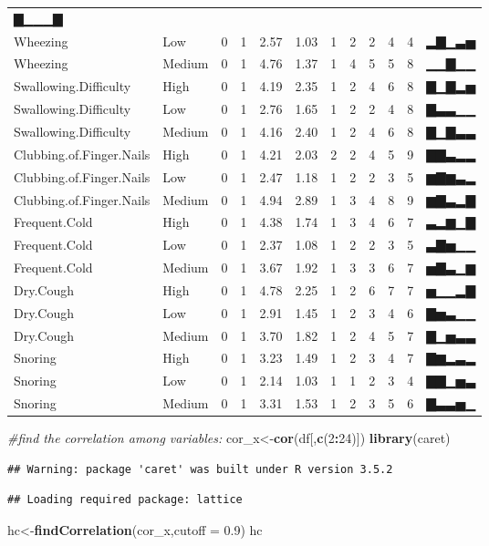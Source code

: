 \documentclass[]{article}
\newenvironment{Shaded}{\begin{snugshade}}{\end{snugshade}}
\newcommand{\KeywordTok}[1]{\textcolor[rgb]{0.13,0.29,0.53}{\textbf{#1}}}
\newcommand{\DataTypeTok}[1]{\textcolor[rgb]{0.13,0.29,0.53}{#1}}
\newcommand{\DecValTok}[1]{\textcolor[rgb]{0.00,0.00,0.81}{#1}}
\newcommand{\FloatTok}[1]{\textcolor[rgb]{0.00,0.00,0.81}{#1}}
\newcommand{\CommentTok}[1]{\textcolor[rgb]{0.56,0.35,0.01}{\textit{#1}}}
\newcommand{\OperatorTok}[1]{\textcolor[rgb]{0.81,0.36,0.00}{\textbf{#1}}}
\newcommand{\NormalTok}[1]{#1}
\begin{document}
\begin{longtable}[]{@{}llrrrrrrrrrl@{}}
▇▁▁▁▇\tabularnewline
Wheezing & Low & 0 & 1 & 2.57 & 1.03 & 1 & 2 & 2 & 4 & 4 &
▂▇▁▃▅\tabularnewline
Wheezing & Medium & 0 & 1 & 4.76 & 1.37 & 1 & 4 & 5 & 5 & 8 &
▁▁▇▁▁\tabularnewline
Swallowing.Difficulty & High & 0 & 1 & 4.19 & 2.35 & 1 & 2 & 4 & 6 & 8 &
▇▁▇▂▅\tabularnewline
Swallowing.Difficulty & Low & 0 & 1 & 2.76 & 1.65 & 1 & 2 & 2 & 4 & 8 &
▇▃▃▁▁\tabularnewline
Swallowing.Difficulty & Medium & 0 & 1 & 4.16 & 2.40 & 1 & 2 & 4 & 6 & 8
& ▇▁▇▃▃\tabularnewline
Clubbing.of.Finger.Nails & High & 0 & 1 & 4.21 & 2.03 & 2 & 2 & 4 & 5 &
9 & ▇▇▃▂▂\tabularnewline
Clubbing.of.Finger.Nails & Low & 0 & 1 & 2.47 & 1.18 & 1 & 2 & 2 & 3 & 5
& ▆▇▆▃▂\tabularnewline
Clubbing.of.Finger.Nails & Medium & 0 & 1 & 4.94 & 2.89 & 1 & 3 & 4 & 8
& 9 & ▆▇▃▂▇\tabularnewline
Frequent.Cold & High & 0 & 1 & 4.38 & 1.74 & 1 & 3 & 4 & 6 & 7 &
▃▂▆▁▇\tabularnewline
Frequent.Cold & Low & 0 & 1 & 2.37 & 1.08 & 1 & 2 & 2 & 3 & 5 &
▃▇▅▁▁\tabularnewline
Frequent.Cold & Medium & 0 & 1 & 3.67 & 1.92 & 1 & 3 & 3 & 6 & 7 &
▅▇▃▁▆\tabularnewline
Dry.Cough & High & 0 & 1 & 4.78 & 2.25 & 1 & 2 & 6 & 7 & 7 &
▅▁▁▂▇\tabularnewline
Dry.Cough & Low & 0 & 1 & 2.91 & 1.45 & 1 & 2 & 3 & 4 & 6 &
▇▅▃▁▁\tabularnewline
Dry.Cough & Medium & 0 & 1 & 3.70 & 1.82 & 1 & 2 & 4 & 5 & 7 &
▇▁▅▃▃\tabularnewline
Snoring & High & 0 & 1 & 3.23 & 1.49 & 1 & 2 & 3 & 4 & 7 &
▇▆▂▃▂\tabularnewline
Snoring & Low & 0 & 1 & 2.14 & 1.03 & 1 & 1 & 2 & 3 & 4 &
▇▇▁▅▃\tabularnewline
Snoring & Medium & 0 & 1 & 3.31 & 1.53 & 1 & 2 & 3 & 5 & 6 &
▇▃▃▅▁\tabularnewline
\bottomrule
\end{longtable}

\begin{Shaded}
\begin{Highlighting}[]
\CommentTok{#find the correlation among variables:}
\NormalTok{cor_x<-}\KeywordTok{cor}\NormalTok{(df[,}\KeywordTok{c}\NormalTok{(}\DecValTok{2}\OperatorTok{:}\DecValTok{24}\NormalTok{)])}
\KeywordTok{library}\NormalTok{(caret)}
\end{Highlighting}
\end{Shaded}

\begin{verbatim}
## Warning: package 'caret' was built under R version 3.5.2
\end{verbatim}

\begin{verbatim}
## Loading required package: lattice
\end{verbatim}

\begin{Shaded}
\begin{Highlighting}[]
\NormalTok{hc<-}\KeywordTok{findCorrelation}\NormalTok{(cor_x,}\DataTypeTok{cutoff =} \FloatTok{0.9}\NormalTok{)}
\NormalTok{hc}
\end{Highlighting}
\end{Shaded}
\end{document}
